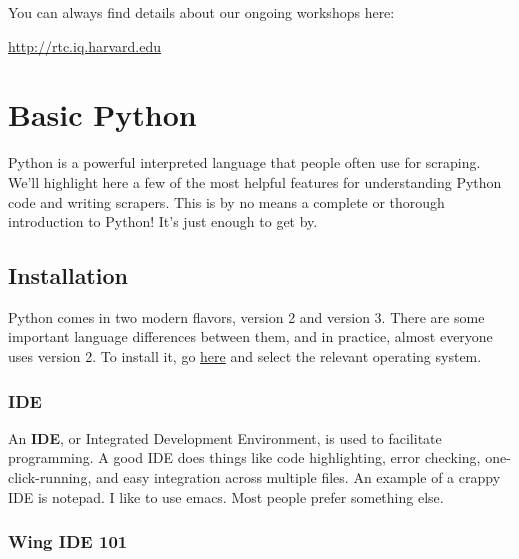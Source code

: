 \documentclass[11pt]{article}
\begin{document}
You can always find details about our ongoing workshops here:

\href{http://rtc.iq.harvard.edu}{http://rtc.iq.harvard.edu}
\section{Basic Python}
\label{sec-2}

Python is a powerful interpreted language that people often use for
scraping.  We'll highlight here a few of the most helpful features for
understanding Python code and writing scrapers.  This is by no means a
complete or thorough introduction to Python!  It's just enough to get
by.
\subsection{Installation}
\label{sec-2-1}

   Python comes in two modern flavors, version 2 and version 3.  There
   are some important language differences between them, and in
   practice, almost everyone uses version 2.  To install it, go \href{http://python.org/download/}{here}
   and select the relevant operating system.
\subsubsection{IDE}
\label{sec-2-1-1}

   An \textbf{IDE}, or Integrated Development Environment, is used to
   facilitate programming.  A good IDE does things like code
   highlighting, error checking, one-click-running, and easy
   integration across multiple files.  An example of a crappy IDE is
   notepad.  I like to use emacs.  Most people prefer something else.
\subsubsection{Wing IDE 101}
\label{sec-2-1-2}
\end{document}
